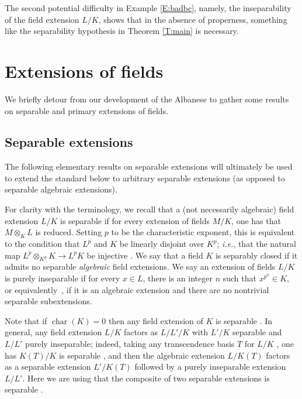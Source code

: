 \documentclass[11pt, reqno]{amsart}
\numberwithin{equation}{section}
\theoremstyle{definition}
\theoremstyle{remark}
\begin{document}
 

 The second potential difficulty in Example \ref{E:badbc}, namely, the
 inseparability of the field extension $L/K$, shows that in the
 absence of properness, something like the 
 separability hypothesis in Theorem \ref{T:main} is necessary.
   
  

 \section{Extensions of fields}

 We briefly detour  from our development of the Albanese to gather
 some results on separable and primary extensions of fields.

\subsection{Separable extensions}\label{S:SepExt}

The following elementary results on separable extensions will
ultimately be used to extend the standard  below 
 to arbitrary separable extensions (as opposed to separable algebraic extensions).  
 
For clarity with the terminology,
 we recall that a (not necessarily algebraic) field extension $L/K$ is separable if for every extension of fields  $M/K$, one has that $M\otimes _KL$ is reduced.  
 Setting $p$ to be the characteristic exponent,  this is equivalent 
    to the condition that $L^p$ and $K$ be linearly disjoint over $K^p$; \emph{i.e.}, that the natural map $L^p\otimes_{K^p}K\to L^pK$ be injective \cite[Rem., p.V.119]{bourbakifields}.
 We say that a field $K$ is separably closed if it admits no separable \emph{algebraic} field extensions.  We say an extension  of fields $L/K$ is  purely inseparable
  if for every $x\in L$, there is an integer $n$ such that $x^{p^n} \in K$, or equivalently~\cite[Prop.~13, p.V.42]{bourbakifields}, if it is an algebraic extension and there are no  nontrivial separable subextensions.  
 
 Note that if $\operatorname{char}(K)=0$ then any field extension of $K$ is separable \cite[Thm.~1, p.V.117]{bourbakifields}.   In general, any field extension $L/K$ 
  factors as $L/L'/K$ with $L'/K$ separable and $L/L'$ purely inseparable; indeed, taking any transcendence basis $T$ for $L/K$ \cite[Thm.~1, p.V.105]{bourbakifields}, one has $K(T)/K$ is separable \cite[Prop.~6, p.V.116]{bourbakifields}, and then the algebraic extension $L/K(T)$ factors as a separable extension $L'/K(T)$ followed by a purely inseparable extension $L/L'$.  
  Here we are using that the composite of two separable extensions is separable \cite[Prop.~9, p.V.117]{bourbakifields}.
  
\end{document}
